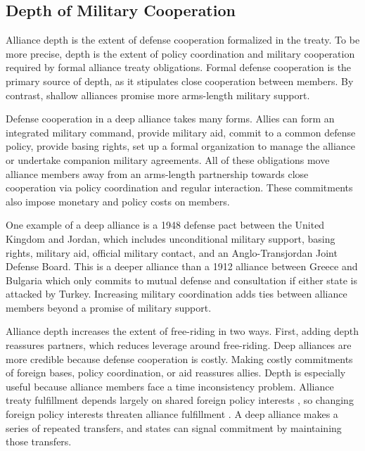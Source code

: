 \documentclass[12pt]{article}
\begin{document}
\subsection{Depth of Military Cooperation} 


Alliance depth is the extent of defense cooperation formalized in the treaty. 
To be more precise, depth is the extent of policy coordination and military cooperation required by formal alliance treaty obligations. 
Formal defense cooperation is the primary source of depth, as it stipulates close cooperation between members.
By contrast, shallow alliances promise more arms-length military support. 


Defense cooperation in a deep alliance takes many forms. 
Allies can form an integrated military command, provide military aid, commit to a common defense policy, provide basing rights, set up a formal organization to manage the alliance or undertake companion military agreements. 
All of these obligations move alliance members away from an arms-length partnership towards close cooperation via policy coordination and regular interaction. 
These commitments also impose monetary and policy costs on members. 

 
One example of a deep alliance is a 1948 defense pact between the United Kingdom and Jordan, which includes unconditional military support, basing rights, military aid, official military contact, and an Anglo-Transjordan Joint Defense Board.  
This is a deeper alliance than a 1912 alliance between Greece and Bulgaria which only commits to mutual defense and consultation if either state is attacked by Turkey. 
Increasing military coordination adds ties between alliance members beyond a promise of military support.


Alliance depth increases the extent of free-riding in two ways. 
First, adding depth reassures partners, which reduces leverage around free-riding.  
Deep alliances are more credible because defense cooperation is costly. 
Making costly commitments of foreign bases, policy coordination, or aid reassures allies. 
Depth is especially useful because alliance members face a time inconsistency problem. 
Alliance treaty fulfillment depends largely on shared foreign policy interests \citep{Morrow2000, Leeds2003a}, so changing foreign policy interests threaten alliance fulfillment \citep{LeedsSavun2007}. 
A deep alliance makes a series of repeated transfers, and states can signal commitment by maintaining those transfers.  
\end{document}
